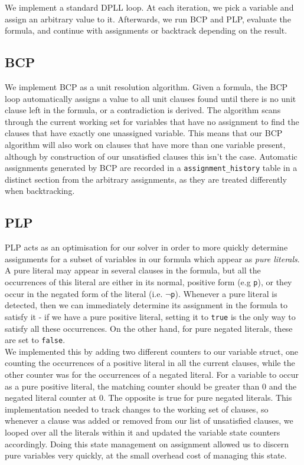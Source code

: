 \documentclass[a4paper]{article}
\begin{document}
We implement a standard DPLL loop. At each iteration, we pick a variable and assign an arbitrary value to it. Afterwards, we run BCP and PLP, evaluate the formula, and continue with assignments or backtrack depending on the result.

\subsection{BCP}

We implement BCP as a unit resolution algorithm. Given a formula, the BCP loop automatically assigns a value to all unit clauses found until there is no unit clause left in the formula, or a contradiction is derived. The algorithm scans through the current working set for variables that have no assignment to find the clauses that have exactly one unassigned variable. This means that our BCP algorithm will also work on clauses that have more than one variable present, although by construction of our unsatisfied clauses this isn't the case. Automatic assignments generated by BCP are recorded in a \texttt{assignment\_history} table in a distinct section from the arbitrary assignments, as they are treated differently when backtracking.

\subsection{PLP}

PLP acts as an optimisation for our solver in order to more quickly determine assignments for a subset of variables in our formula which appear as \textit{pure literals}. A pure literal may appear in several clauses in the formula, but all the occurrences of this literal are either in its normal, positive form (e.g \texttt{p}), or they occur in the negated form of the literal (i.e. $\neg$\texttt{p}). Whenever a pure literal is detected, then we can immediately determine its assignment in the formula to satisfy it - if we have a pure positive literal, setting it to \texttt{true} is the only way to satisfy all these occurrences. On the other hand, for pure negated literals, these are set to \texttt{false}. \\

We implemented this by adding two different counters to our variable struct, one counting the occurrences of a positive literal in all the current clauses, while the other counter was for the occurrences of a negated literal. For a variable to occur as a pure positive literal, the matching counter should be greater than 0 and the negated literal counter at 0. The opposite is true for pure negated literals. This implementation needed to track changes to the working set of clauses, so whenever a clause was added or removed from our list of unsatisfied clauses, we looped over all the literals within it and updated the variable state counters accordingly. Doing this state management on assignment allowed us to discern pure variables very quickly, at the small overhead cost of managing this state.
\end{document}
